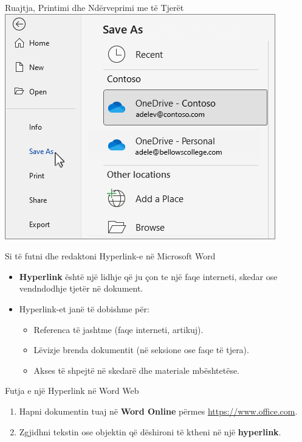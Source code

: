 \documentclass[
  ignorenonframetext,
]{beamer}
\begin{document}
\begin{frame}{Ruajtja, Printimi dhe Ndërveprimi me të Tjerët}
\label{ruajtja-printimi-dhe-nduxebrveprimi-me-tuxeb-tjeruxebt-1}
\includegraphics{./images/word25.png}
\end{frame}

\begin{frame}{Si të futni dhe redaktoni Hyperlink-e në Microsoft Word}
\label{si-tuxeb-futni-dhe-redaktoni-hyperlink-e-nuxeb-microsoft-word}
\begin{itemize}
\item
  \textbf{Hyperlink} është një lidhje që ju çon te një faqe interneti,
  skedar ose vendndodhje tjetër në dokument.
\item
  Hyperlink-et janë të dobishme për:

  \begin{itemize}
  \item
    Referenca të jashtme (faqe interneti, artikuj).
  \item
    Lëvizje brenda dokumentit (në seksione ose faqe të tjera).
  \item
    Akses të shpejtë në skedarë dhe materiale mbështetëse.
  \end{itemize}
\end{itemize}
\end{frame}

\begin{frame}{Futja e një Hyperlink në Word Web}
\label{futja-e-njuxeb-hyperlink-nuxeb-word-web}
\begin{enumerate}
\item
  Hapni dokumentin tuaj në \textbf{Word Online} përmes
  \url{https://www.office.com}.
\item
  Zgjidhni tekstin ose objektin që dëshironi të ktheni në një
  \textbf{hyperlink}.
\end{enumerate}
\end{frame}
\end{document}
